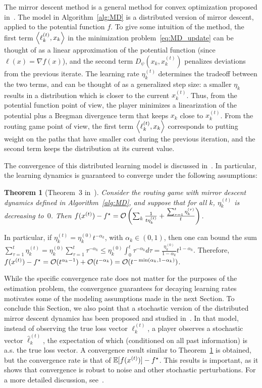 \documentclass{sig-alternate-ipsn13}
\newtheorem{theorem}{Theorem}
\begin{document}
The mirror descent method is a general method for convex optimization proposed in~\cite{nemirovski1983problem}. The model in Algorithm~\ref{alg:MD} is a distributed version of mirror descent, applied to the potential function $f$. To give some intuition of the method, the first term $\left\langle \ell_k^{(t)}, x_k \right\rangle$ in the minimization problem~\eqref{eq:MD_update} can be thought of as a linear approximation of the potential function (since $\ell(x) = \nabla f(x)$), and the second term $D_\psi(x_k, x^{(t)}_k)$ penalizes deviations from the previous iterate. The learning rate $\eta_k^{(t)}$ determines the tradeoff between the two terms, and can be thought of as a generalized step size: a smaller $\eta_k$ results in a distribution which is closer to the current $x_k^{(t)}$. Thus, from the potential function point of view, the player minimizes a linearization of the potential plus a Bregman divergence term that keeps $x_k$ close to $x_k^{(t)}$. From the routing game point of view, the first term $\left\langle \ell^{(t)}_k, x_k \right\rangle$ corresponds to putting weight on the paths that have smaller cost during the previous iteration, and the second term keeps the distribution at its current value.

The convergence of this distributed learning model is discussed in~\cite{krichene2015MD}. In particular, the learning dynamics is guaranteed to converge under the following assumptions:
\begin{theorem}[Theorem~3 in~\cite{krichene2015MD}]
\label{thm:convergence}
Consider the routing game with mirror descent dynamics defined in Algorithm~\ref{alg:MD}, and suppose that for all $k$, $\eta_k^{(t)}$ is decreasing to~$0$. Then $f(x^{(t)}) - f^\star = \mathcal{O}\left( \sum_k \frac{1}{t\eta_k^{(t)}} + \frac{\sum_{\tau = 1}^t \eta_k^{(\tau)}}{t}  \right)$.
\end{theorem}

In particular, if $\eta_k^{(t)} = \eta^{(0)}_k t^{-\alpha_k}$, with $\alpha_k \in (0, 1)$, then one can bound the sum $\sum_{\tau = 1}^t \eta_k^{(t)} = \eta^{(0)}_k \sum_{\tau = 1}^t \tau^{-\alpha_k} \leq \eta^{(0)}_k \int_0^t \tau^{-\alpha_k} d\tau = \frac{\eta^{(0)}_k}{1-\alpha_k} t^{1-\alpha_k}$. Therefore, $f(x^{(t)}) - f^\star = \mathcal{O}(t^{\alpha_k - 1}) + \mathcal{O}(t^{-\alpha_k}) = \mathcal{O}(t^{-\min(\alpha_k, 1-\alpha_k)})$.

While the specific convergence rate does not matter for the purposes of the estimation problem, the convergence guarantees for decaying learning rates motivates some of the modeling assumptions made in the next Section. To conclude this Section, we also point that a stochastic version of the distributed mirror descent dynamics has been proposed and studied in~\cite{krichene2015SMD}. In that model, instead of observing the true loss vector $\ell^{(t)}_k$, a player observes a stochastic vector $\hat \ell^{(t)}_k$, the expectation of which (conditioned on all past information) is a.s. the true loss vector. A convergence result similar to Theorem~\ref{thm:convergence} is obtained, but the convergence rate is that of $\operatorname*{\mathbb{E}}[f(x^{(t)})] - f^\star$. This results is important, as it shows that convergence is robust to noise and other stochastic perturbations. For a more detailed discussion, see~\cite{krichene2015SMD}.
\end{document}
